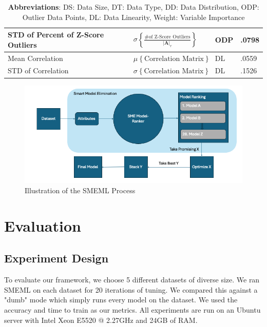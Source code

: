\documentclass{article}
\begin{document}
\begin{table}
\begin{tabular}{llll}
    \hline
    STD of Percent of Z-Score Outliers  &
    $\sigma \left\{ \frac{\text{\# of Z-Score Outliers}}{|\mathbf{A}|_r} \right\}$ & ODP & .0798 \\
    \hline
    Mean Correlation& $\mu \left\{\text{Correlation Matrix}\right\}$ & DL & .0559 \\
    \hline
    STD of Correlation & $\sigma \left\{\text{Correlation Matrix}\right\}$ & DL & .1526 \\
    \bottomrule
  \end{tabular}
  \captionsetup{font=footnotesize}
  \caption*{\textbf{Abbreviations}: DS: Data Size, DT: Data Type, DD: Data Distribution, ODP: Outlier Data Points, DL: Data Linearity, Weight: Variable Importance}
\end{table}


\begin {figure}
\centering
\includegraphics[width=\textwidth]{smeml-flowchart.png}
\caption{Illustration of the SMEML Process}
\end{figure}

\section{Evaluation}
\subsection{Experiment Design}
To evaluate our framework, we choose 5 different datasets of diverse size. We ran SMEML on each dataset for 20 iterations of tuning. We compared this against a "dumb" mode which simply runs every model on the dataset. We used the accuracy and time to train as our metrics. All experiments are run on an Ubuntu server with Intel Xeon E5520 @ 2.27GHz and 24GB of RAM.
\end{document}
